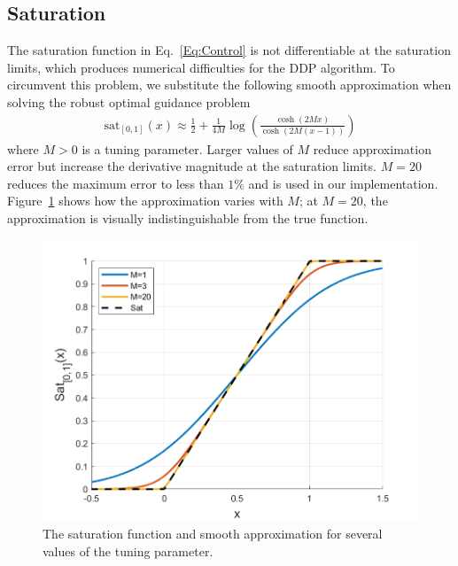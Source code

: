 \subsection{Saturation}
The saturation function in Eq.~\eqref{Eq:Control} is not differentiable at the  saturation limits, which produces numerical difficulties for the DDP algorithm. To circumvent this problem, we substitute the following smooth approximation when solving the robust optimal guidance problem
\begin{align*}
	\mathrm{sat}_{[0,1]}(x) \approx \frac{1}{2} + \frac{1}{4M}\log\left(\frac{\cosh (2Mx)}{\cosh (2M(x-1))}\right) 
\end{align*}
where $M>0$ is a tuning parameter. Larger values of $M$ reduce approximation error but increase the derivative magnitude at the saturation limits. $M=20$ reduces the maximum error to less than $1\%$ and is used in our implementation. Figure~\ref{Fig:SmoothSat} shows how the approximation varies with $M$; at $M=20$, the approximation is visually indistinguishable from the true function.
\begin{figure}[h!]
	\centering
	\includegraphics[width=1\textwidth]{Images/SmoothSat}
	\caption{The saturation function and smooth approximation for several values of the tuning parameter.}
	\label{Fig:SmoothSat}
\end{figure}




